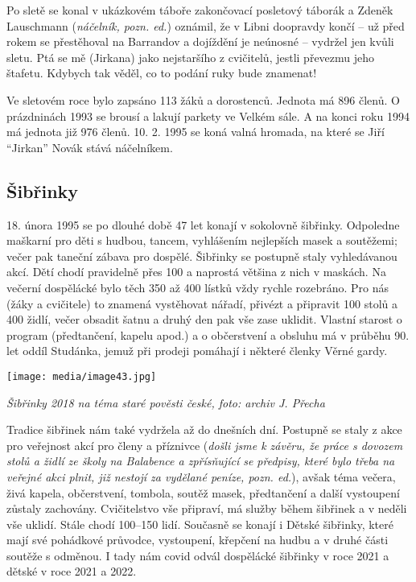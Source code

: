 Po sletě se konal v ukázkovém táboře zakončovací posletový táborák a
Zdeněk Lauschmann (\emph{náčelník, pozn. ed.}) oznámil, že v Libni
doopravdy končí -- už před rokem se přestěhoval na Barrandov a dojíždění
je neúnosné -- vydržel jen kvůli sletu. Ptá se mě (Jirkana) jako
nejstaršího z cvičitelů, jestli převezmu jeho štafetu. Kdybych tak
věděl, co to podání ruky bude znamenat!

Ve sletovém roce bylo zapsáno 113 žáků a dorostenců. Jednota má 896
členů. O prázdninách 1993 se brousí a lakují parkety ve Velkém sále. A
na konci roku 1994 má jednota již 976 členů. 10. 2. 1995 se koná valná
hromada, na které se Jiří ``Jirkan'' Novák stává náčelníkem.

\subsection{Šibřinky}\label{ux161ibux159inky}

18. února 1995 se po dlouhé době 47 let konají v sokolovně šibřinky.
Odpoledne maškarní pro děti s hudbou, tancem, vyhlášením nejlepších
masek a soutěžemi; večer pak taneční zábava pro dospělé. Šibřinky se
postupně staly vyhledávanou akcí. Dětí chodí pravidelně přes 100 a
naprostá většina z nich v maskách. Na večerní dospělácké bylo těch 350
až 400 lístků vždy rychle rozebráno. Pro nás (žáky a cvičitele) to
znamená vystěhovat nářadí, přivézt a připravit 100 stolů a 400 židlí,
večer obsadit šatnu a druhý den pak vše zase uklidit. Vlastní starost o
program (předtančení, kapelu apod.) a o občerstvení a obsluhu má v
průběhu 90. let oddíl Studánka, jemuž při prodeji pomáhají i některé
členky Věrné gardy.

\texttt{[image: media/image43.jpg]}

\emph{Šibřinky 2018 na téma staré pověsti české, foto: archiv J. Přecha}

Tradice šibřinek nám také vydržela až do dnešních dní. Postupně se staly
z akce pro veřejnost akcí pro členy a příznivce (\emph{došli jsme k
závěru, že práce s dovozem stolů a židlí ze školy na Balabence a
zpřísňující se předpisy, které bylo třeba na veřejné akci plnit, již
nestojí za vydělané peníze, pozn. ed.}), avšak téma večera, živá kapela,
občerstvení, tombola, soutěž masek, předtančení a další vystoupení
zůstaly zachovány. Cvičitelstvo vše připraví, má služby během šibřinek a
v neděli vše uklidí. Stále chodí 100--150 lidí. Současně se konají i
Dětské šibřinky, které mají své pohádkové průvodce, vystoupení, křepčení
na hudbu a v druhé části soutěže s odměnou. I tady nám covid odvál
dospělácké šibřinky v roce 2021 a dětské v roce 2021 a 2022.

